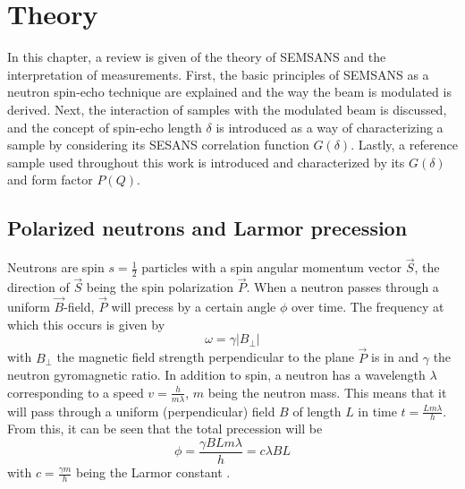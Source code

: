 \chapter{Theory}
\label{chapter:theory}
\label{c2:theory}
In this chapter, a review is given of the theory of SEMSANS and the interpretation of measurements. First, the basic principles of SEMSANS as a neutron spin-echo technique are explained and the way the beam is modulated is derived. Next, the interaction of samples with the modulated beam is discussed, and the concept of spin-echo length $\delta$ is introduced as a way of characterizing a sample by considering its SESANS correlation function $G(\delta)$. Lastly, a reference sample used throughout this work is introduced and characterized by its $G(\delta)$ and form factor $P(Q)$. 

\section{Polarized neutrons and Larmor precession}
\label{c2.1}
Neutrons are spin $s=\frac{1}{2}$ particles with a spin angular momentum vector $\vec{S}$, the direction of $\vec{S}$ being the spin polarization $\vec{P}$. When a neutron passes through a uniform $\vec{B}$-field, $\vec{P}$ will precess by a certain angle $\phi$ over time. The frequency at which this occurs is given by
$$\omega = \gamma |B_\perp|$$
with $B_\perp$ the magnetic field strength perpendicular to the plane $\vec{P}$ is in and $\gamma$ the neutron gyromagnetic ratio. In addition to spin, a neutron has a wavelength $\lambda$ corresponding to a speed $v = \frac{h}{m\lambda}$, $m$ being the neutron mass. This means that it will pass through a uniform (perpendicular) field $B$ of length $L$ in time $t = \frac{Lm\lambda}{h}$. From this, it can be seen that the total precession will be 
\begin{equation}
	\phi = \frac{\gamma B L m\lambda}{h} = c\lambda B L \label{eq:larmor-prec}
\end{equation}
with $c = \frac{\gamma m}{h}$ being the Larmor constant \cite{bouwman2021b}.   
